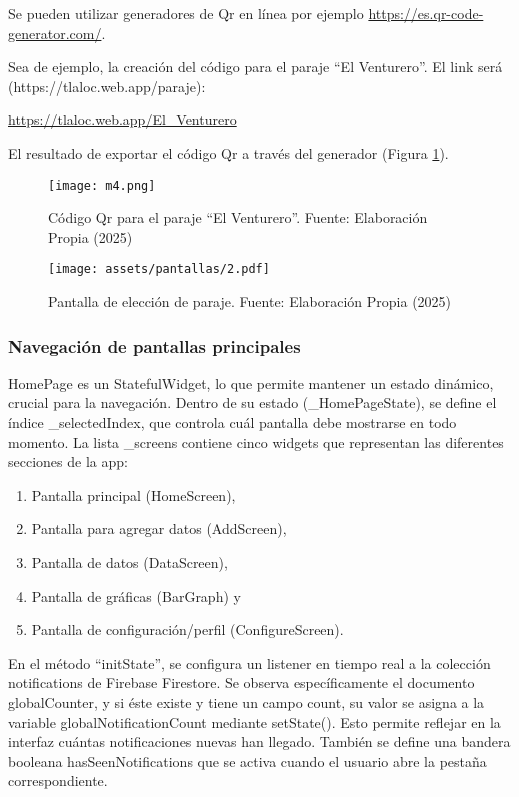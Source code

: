 Se pueden utilizar generadores de Qr en línea por ejemplo \url{https://es.qr-code-generator.com/}.

  Sea de ejemplo, la creación del código para el paraje ``El Venturero''. El link será (https://tlaloc.web.app/paraje):
  \begin{center}
    \url{https://tlaloc.web.app/El_Venturero}
  \end{center}
  El resultado de exportar el código Qr a través del generador (Figura \ref{m4}).
  \begin{figure}[h!]
  \centering
    \texttt{[image: m4.png]}
    \caption{Código Qr para el paraje ``El Venturero''. Fuente: Elaboración Propia (2025)}
    \label{m4}
  \end{figure} 


\begin{figure}[h!]
\centering
  \texttt{[image: assets/pantallas/2.pdf]}
  \caption{Pantalla de elección de paraje. Fuente: Elaboración Propia (2025)}
  \label{pantallas3}
\end{figure}
\newpage




\newpage
\subsubsection*{Navegación de pantallas principales}

HomePage es un StatefulWidget, lo que permite mantener un estado dinámico, crucial para la navegación. Dentro de su estado (\_HomePageState), se define el índice \_selectedIndex, que controla cuál pantalla debe mostrarse en todo momento. La lista \_screens contiene cinco widgets que representan las diferentes secciones de la app: 
\begin{enumerate}
  \item Pantalla principal (HomeScreen),
  \item Pantalla para agregar datos (AddScreen),
  \item Pantalla de datos (DataScreen), 
  \item Pantalla de gráficas (BarGraph) y
  \item Pantalla de configuración/perfil (ConfigureScreen).
\end{enumerate}

En el método ``initState'', se configura un listener en tiempo real a la colección notifications de Firebase Firestore. Se observa específicamente el documento globalCounter, y si éste existe y tiene un campo count, su valor se asigna a la variable globalNotificationCount mediante setState(). Esto permite reflejar en la interfaz cuántas notificaciones nuevas han llegado. También se define una bandera booleana hasSeenNotifications que se activa cuando el usuario abre la pestaña correspondiente.

